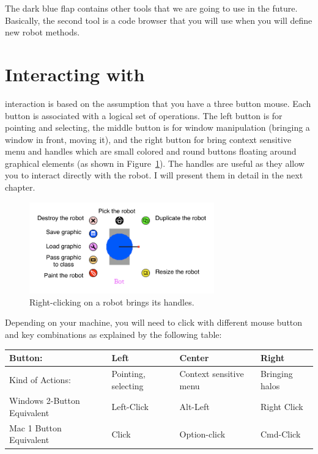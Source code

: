 The dark blue flap contains other tools that we are going to use in the future. Basically, the second tool is a code browser that you will use when you will define new robot methods. 


\section{Interacting with \sq}
\sq interaction is based on the assumption that you have a three button mouse. Each button is associated with a logical set of operations. The left button is for pointing and selecting, the middle button is for window manipulation (bringing a window in front, moving it), and the right button for bring context sensitive menu and handles which are small colored and round buttons floating around graphical elements (as shown in Figure~\ref{fig:rohals}). The handles are useful as they allow you to interact directly with the robot. I will present them in detail in the next chapter.  

\begin{figure}[h]
\begin{center}
\includegraphics[width=8cm]{picaAllHaloAnnotated}
\caption{Right-clicking on a robot brings its handles.\label{fig:rohals}}
\end{center}
\end{figure}


Depending on your machine, you will need to click with different mouse button and key combinations as explained by the following table: 

\begin{center}
\begin{tabular}{|| p{2.5cm} | p{3cm} | p{3cm} | p{3cm} ||} \hline \hline
Button:           &   Left       &    Center       &  Right \\ \hline \hline
Kind of Actions:  &  Pointing, selecting     & Context    sensitive menu  &   Bringing halos \\ \hline
Windows 2-Button  Equivalent&   Left-Click    & Alt-Left    &   Right Click \\ \hline
Mac 1 Button  Equivalent&  Click      &    Option-click &  Cmd-Click \\ \hline 
\hline
\end{tabular}
\end{center}


